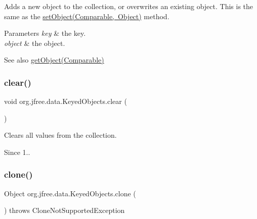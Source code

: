 Adds a new object to the collection, or overwrites an existing object. This is the same as the \mbox{\hyperlink{classorg_1_1jfree_1_1data_1_1_keyed_objects_aeb12f4c31d2ec23d2dda75a114e7813c}{set\+Object(\+Comparable, Object)}} method.


\begin{DoxyParams}{Parameters}
{\em key} & the key. \\
\hline
{\em object} & the object.\\
\hline
\end{DoxyParams}
\begin{DoxySeeAlso}{See also}
\mbox{\hyperlink{classorg_1_1jfree_1_1data_1_1_keyed_objects_aad4f61f3e7f311960cf0064b8d304155}{get\+Object(\+Comparable)}} 
\end{DoxySeeAlso}
\mbox{\label{classorg_1_1jfree_1_1data_1_1_keyed_objects_aa01897f6cefde8c7f490c710fb8977f3}} 
\subsubsection{\texorpdfstring{clear()}{clear()}}
{\footnotesize\ttfamily void org.\+jfree.\+data.\+Keyed\+Objects.\+clear (\begin{DoxyParamCaption}{ }\end{DoxyParamCaption})}

Clears all values from the collection.

\begin{DoxySince}{Since}
1.. 
\end{DoxySince}
\mbox{\label{classorg_1_1jfree_1_1data_1_1_keyed_objects_a657f87b7af08a384f56765840f59d44b}} 
\subsubsection{\texorpdfstring{clone()}{clone()}}
{\footnotesize\ttfamily Object org.\+jfree.\+data.\+Keyed\+Objects.\+clone (\begin{DoxyParamCaption}{ }\end{DoxyParamCaption}) throws Clone\+Not\+Supported\+Exception}

